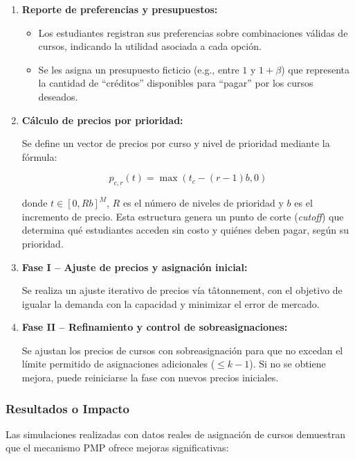 \documentclass{article}
\begin{document}
\begin{enumerate}
    \item \textbf{Reporte de preferencias y presupuestos:}
    \begin{itemize}
        \item Los estudiantes registran sus preferencias sobre combinaciones válidas de cursos, indicando la utilidad asociada a cada opción.
        \item Se les asigna un presupuesto ficticio (e.g., entre $1$ y $1 + \beta$) que representa la cantidad de “créditos” disponibles para “pagar” por los cursos deseados.
    \end{itemize}

    \item \textbf{Cálculo de precios por prioridad:}

    Se define un vector de precios por curso y nivel de prioridad mediante la fórmula:

    \[
    p_{c,r}(t) = \max(t_c - (r - 1)b, 0)
    \]

    donde $t \in [0, Rb]^M$, $R$ es el número de niveles de prioridad y $b$ es el incremento de precio. Esta estructura genera un punto de corte (\textit{cutoff}) que determina qué estudiantes acceden sin costo y quiénes deben pagar, según su prioridad.

    \item \textbf{Fase I – Ajuste de precios y asignación inicial:}

    Se realiza un ajuste iterativo de precios vía tâtonnement, con el objetivo de igualar la demanda con la capacidad y minimizar el error de mercado.

    \item \textbf{Fase II – Refinamiento y control de sobreasignaciones:}

    Se ajustan los precios de cursos con sobreasignación para que no excedan el límite permitido de asignaciones adicionales ($\leq k - 1$). Si no se obtiene mejora, puede reiniciarse la fase con nuevos precios iniciales.
\end{enumerate}

\subsubsection{Resultados o Impacto}

Las simulaciones realizadas con datos reales de asignación de cursos demuestran que el mecanismo PMP ofrece mejoras significativas:
\end{document}
